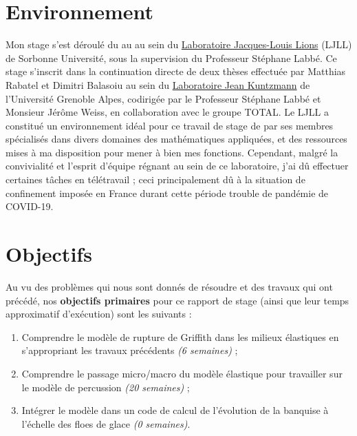 




\section{Environnement}


Mon stage s'est déroulé du  au  au sein du \href{https://www.ljll.math.upmc.fr/en/?lang=fr}{Laboratoire Jacques-Louis Lions} (LJLL) de Sorbonne Université, sous la supervision du Professeur Stéphane Labbé. Ce stage s'inscrit dans la continuation directe de deux thèses effectuée par Matthias Rabatel \Parencite{rabatel2015thesis} et Dimitri Balasoiu \parencite{balasoiu2020halthesis} au sein du \href{https://www-ljk.imag.fr/}{Laboratoire Jean Kuntzmann} de l'Université Grenoble Alpes, codirigée par le Professeur Stéphane Labbé et Monsieur Jérôme Weiss, en collaboration avec le groupe TOTAL. Le LJLL a constitué un environnement idéal pour ce travail de stage de par ses membres spécialisés dans divers domaines des mathématiques appliquées, et des ressources mises à ma disposition pour mener à bien mes fonctions. Cependant, malgré la convivialité et l'esprit d'équipe régnant au sein de ce laboratoire, j'ai dû effectuer certaines tâches en télétravail ; ceci principalement dû à la situation de confinement imposée en France durant cette période trouble de pandémie de COVID-19.








\section{Objectifs}
\label{sec:introobk}

Au vu des problèmes qui nous sont donnés de résoudre et des travaux qui ont précédé, nos \textbf{objectifs primaires} pour ce rapport de stage (ainsi que leur temps approximatif d'exécution) sont les suivants :
\begin{enumerate}
    \item Comprendre le modèle de rupture de Griffith dans les milieux élastiques en s'appropriant les travaux précédents \emph{(6 semaines)} ;
    \item Comprendre le passage micro/macro du modèle élastique pour travailler sur le modèle de percussion \emph{(20 semaines)} ; 
    \item Intégrer le modèle dans un code de calcul de l’évolution
    de la banquise à l’échelle des floes de glace \emph{(0 semaines)}.
\end{enumerate}

